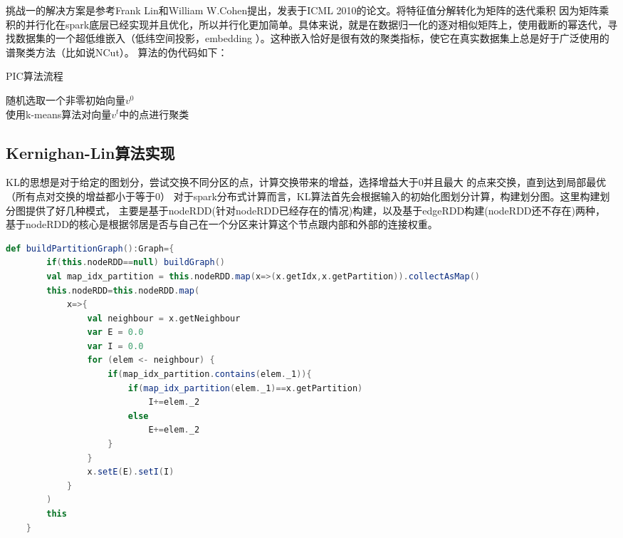 挑战一的解决方案是参考Frank Lin和William W.Cohen提出，发表于ICML 2010的论文。将特征值分解转化为矩阵的迭代乘积
因为矩阵乘积的并行化在spark底层已经实现并且优化，所以并行化更加简单。具体来说，就是在数据归一化的逐对相似矩阵上，使用截断的幂迭代，寻找数据集的一个超低维嵌入（低纬空间投影，embedding ）。这种嵌入恰好是很有效的聚类指标，使它在真实数据集上总是好于广泛使用的谱聚类方法（比如说NCut）。
算法的伪代码如下：
\begin{algorithm}[htbp]
\caption{PIC算法流程}
\SetAlgoLined
{}
随机选取一个非零初始向量$v^0$ \\
使用k-means算法对向量$v^t$中的点进行聚类
\end{algorithm}

\subsection{Kernighan-Lin算法实现}

KL的思想是对于给定的图划分，尝试交换不同分区的点，计算交换带来的增益，选择增益大于0并且最大
的点来交换，直到达到局部最优（所有点对交换的增益都小于等于0）
对于spark分布式计算而言，KL算法首先会根据输入的初始化图划分计算，构建划分图。这里构建划分图提供了好几种模式，
主要是基于nodeRDD(针对nodeRDD已经存在的情况)构建，以及基于edgeRDD构建(nodeRDD还不存在)两种，
基于nodeRDD的核心是根据邻居是否与自己在一个分区来计算这个节点跟内部和外部的连接权重。


\begin{lstlisting}[language=Scala]
def buildPartitionGraph():Graph={
        if(this.nodeRDD==null) buildGraph()
        val map_idx_partition = this.nodeRDD.map(x=>(x.getIdx,x.getPartition)).collectAsMap()
        this.nodeRDD=this.nodeRDD.map(
            x=>{
                val neighbour = x.getNeighbour
                var E = 0.0
                var I = 0.0
                for (elem <- neighbour) {
                    if(map_idx_partition.contains(elem._1)){
                        if(map_idx_partition(elem._1)==x.getPartition)
                            I+=elem._2
                        else
                            E+=elem._2
                    }
                }
                x.setE(E).setI(I)
            }
        )
        this
    }
\end{lstlisting}

